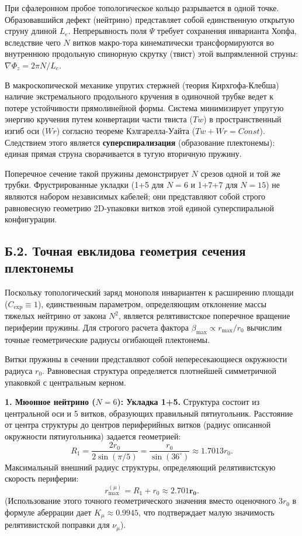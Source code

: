 \documentclass[11pt,a4paper]{article}
\begin{document}
	При сфалеронном пробое топологическое кольцо разрывается в одной точке. Образовавшийся дефект (нейтрино) представляет собой единственную открытую струну длиной $L_e$. Непрерывность поля $\Psi$ требует сохранения инварианта Хопфа, вследствие чего $N$ витков макро-тора кинематически трансформируются во внутреннюю продольную спинорную скрутку (твист) этой выпрямленной струны: $\nabla \Phi_z = 2\pi N / L_e$.
	
	В макроскопической механике упругих стержней (теория Кирхгофа-Клебша) наличие экстремального продольного кручения в одиночной трубке ведет к потере устойчивости прямолинейной формы. Система минимизирует упругую энергию кручения путем конвертации части твиста ($Tw$) в пространственный изгиб оси ($Wr$) согласно теореме Кэлгарелла-Уайта ($Tw + Wr = Const$).
	Следствием этого является \textbf{суперспирализация} (образование плектонемы): единая прямая струна сворачивается в тугую вторичную пружину. 
	
	Поперечное сечение такой пружины демонстрирует $N$ срезов одной и той же трубки. Фрустрированные укладки (1+5 для $N=6$ и 1+7+7 для $N=15$) не являются набором независимых кабелей; они представляют собой строго равновесную геометрию 2D-упаковки витков этой единой суперспиральной конфигурации.
	
	\subsection*{Б.2. Точная евклидова геометрия сечения плектонемы}
	Поскольку топологический заряд монополя инвариантен к расширению площади ($C_{\text{exp}} \equiv 1$), единственным параметром, определяющим отклонение массы тяжелых нейтрино от закона $N^2$, является релятивистское поперечное вращение периферии пружины. Для строгого расчета фактора $\beta_{\text{max}} \propto r_{\text{max}}/r_0$ вычислим точные геометрические радиусы огибающей плектонемы.
	
	Витки пружины в сечении представляют собой непересекающиеся окружности радиуса $r_0$. Равновесная структура определяется плотнейшей симметричной упаковкой с центральным керном.
	
	\textbf{1. Мюонное нейтрино ($N=6$): Укладка 1+5.}
	Структура состоит из центральной оси и 5 витков, образующих правильный пятиугольник. Расстояние от центра структуры до центров периферийных витков (радиус описанной окружности пятиугольника) задается геометрией:
	\begin{equation}
		R_1 = \frac{2 r_0}{2 \sin(\pi/5)} = \frac{r_0}{\sin(36^\circ)} \approx 1.7013 r_0.
	\end{equation}
	Максимальный внешний радиус структуры, определяющий релятивистскую скорость периферии:
	\begin{equation}
		r_{\text{max}}^{(\mu)} = R_1 + r_0 \approx \mathbf{2.701 r_0}.
	\end{equation}
	(Использование этого точного геометрического значения вместо оценочного $3r_0$ в формуле аберрации дает $K_\mu \approx 0.9945$, что подтверждает малую значимость релятивистской поправки для $\nu_\mu$).
	
\end{document}
